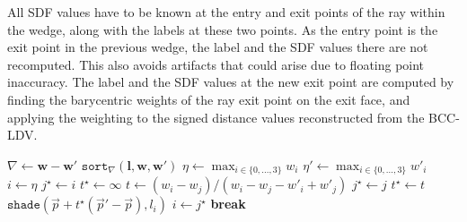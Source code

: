 \documentclass[journal]{vgtc}                     %
\newcommand{\Break}{\State \textbf{break} }
\begin{document}
All SDF values have to be known at the entry and exit points of the ray within the wedge, along with the labels at these two points. As the entry point is the exit point in the previous wedge, the label and the SDF values there are not recomputed. This also avoids artifacts that could arise due to floating point inaccuracy. The label and the SDF values at the new exit point are computed by finding the barycentric weights of the ray exit point on the exit face, and applying the weighting to the signed distance values reconstructed from the BCC-LDV.



\begin{algorithm}[b!]
	\caption{Shade-intersections. The input is the labels at the four vertices $\mathbf{l}$, the entry $\vec{p}$ and exit $\vec{p}'$ points in the wedge along the ray, and the interpolated distance function values at both points for each vertex $\mathbf{w}, \mathbf{w}'$. Note that vertices with identical labels share SDFs, with repeated entries in $\mathbf{w}$.}\label{alg:findter}
	\begin{algorithmic}
		\State $\nabla \gets \mathbf{w} - \mathbf{w}'$ 
		\State $\texttt{sort}_{\nabla}(\mathbf{l}, \mathbf{w}, \mathbf{w}')$ 
		\State $\eta \gets \max_{i \in \{0,...,3\}} w_i$ 
		\State $\eta' \gets \max_{i \in \{0,...,3\}} w'_i$ 
		\State $i \gets \eta$ 
		\State $j^\star \gets i$ 
		\State $t^\star \gets \infty$ 
		 
		 
		\State $t \gets (w_i - w_j) / (w_i - w_j - w'_i + w'_j)$
		\If{$t \in [0,t^\star)$} 
		\State $j^\star \gets j$
		\State $t^\star \gets t$
		\EndIf
		\EndIf
		\EndFor
		 
		\State $\texttt{shade}(\vec{p} + t^\star (\vec{p}' - \vec{p}), l_i)$
		\State $i \gets j^\star$ 
		\Else {}
		\Break
		\EndIf
		\EndWhile
		\EndProcedure
	\end{algorithmic}
\end{algorithm}
\end{document}
